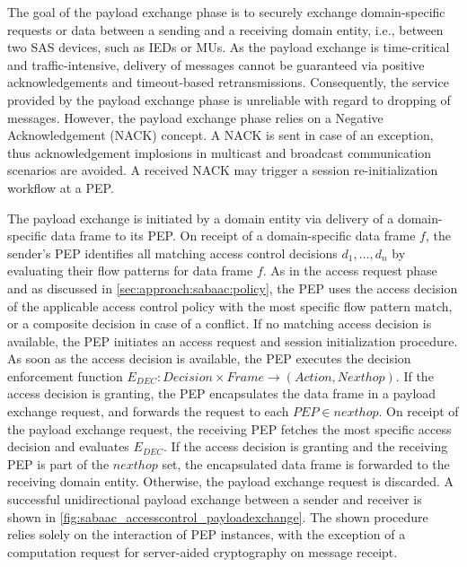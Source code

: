 \begin{description}
    The goal of the payload exchange phase is to securely exchange domain-specific requests or data between a sending and a receiving domain entity, i.e., between two SAS devices, such as IEDs or MUs.
    As the payload exchange is time-critical and traffic-intensive, delivery of messages cannot be guaranteed via positive acknowledgements and timeout-based retransmissions.
    Consequently, the service provided by the payload exchange phase is unreliable with regard to dropping of messages.
    However, the payload exchange phase relies on a Negative Acknowledgement (NACK) concept.
    A NACK is sent in case of an exception, thus acknowledgement implosions in multicast and broadcast communication scenarios are avoided.
    A received NACK may trigger a session re-initialization workflow at a PEP.

    The payload exchange is initiated by a domain entity via delivery of a domain-specific data frame to its PEP.
    On receipt of a domain-specific data frame $f$, the sender's PEP identifies all matching access control decisions $d_1, \dots, d_n$ by evaluating their flow patterns for data frame $f$.
    As in the access request phase and as discussed in \autoref{sec:approach:sabaac:policy}, the PEP uses the access decision of the applicable access control policy with the most specific flow pattern match, or a composite decision in case of a conflict.
    If no matching access decision is available, the PEP initiates an access request and session initialization procedure.
    As soon as the access decision is available, the PEP executes the decision enforcement function $E_{DEC}: Decision \times Frame \rightarrow (Action, Nexthop)$.
    If the access decision is granting, the PEP encapsulates the data frame in a payload exchange request, and forwards the request to each $PEP \in nexthop$.
    On receipt of the payload exchange request, the receiving PEP fetches the most specific access decision and evaluates $E_{DEC}$.
    If the access decision is granting and the receiving PEP is part of the $nexthop$ set, the encapsulated data frame is forwarded to the receiving domain entity.
    Otherwise, the payload exchange request is discarded.
    A successful unidirectional payload exchange between a sender and receiver is shown in \autoref{fig:sabaac_accesscontrol_payloadexchange}.
    The shown procedure relies solely on the interaction of PEP instances, with the exception of a computation request for server-aided cryptography on message receipt.
    \begin{figure}
        \centering

\end{figure}
\end{description}
